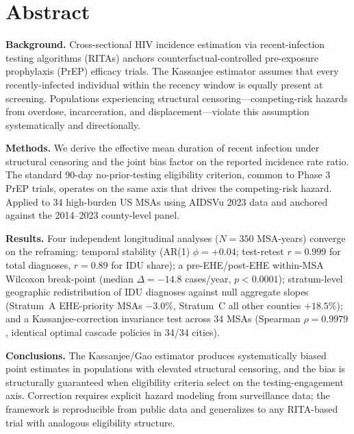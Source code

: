 \documentclass[12pt]{article}
\begin{document}
\newpage

\section*{Abstract}

\noindent\textbf{Background.} Cross-sectional HIV incidence estimation via recent-infection testing algorithms (RITAs) anchors counterfactual-controlled pre-exposure prophylaxis (PrEP) efficacy trials. The Kassanjee estimator assumes that every recently-infected individual within the recency window is equally present at screening. Populations experiencing structural censoring---competing-risk hazards from overdose, incarceration, and displacement---violate this assumption systematically and directionally.
\medskip

\noindent\textbf{Methods.} We derive the effective mean duration of recent infection under structural censoring and the joint bias factor on the reported incidence rate ratio. The standard 90-day no-prior-testing eligibility criterion, common to Phase 3 PrEP trials, operates on the same axis that drives the competing-risk hazard. Applied to 34 high-burden US MSAs using AIDSVu 2023 data and anchored against the 2014--2023 county-level panel.
\medskip

\noindent\textbf{Results.} Four independent longitudinal analyses ($N = 350$ MSA-years) converge on the reframing: temporal stability (AR(1) $\phi = +0.04$; test-retest $r = 0.999$ for total diagnoses, $r = 0.89$ for IDU share); a pre-EHE/post-EHE within-MSA Wilcoxon break-point (median $\Delta = -14.8$ cases/year, $p < 0.0001$); stratum-level geographic redistribution of IDU diagnoses against null aggregate slopes (Stratum~A EHE-priority MSAs $-3.0\%$, Stratum~C all other counties $+18.5\%$); and a Kassanjee-correction invariance test across 34 MSAs (Spearman $\rho = 0.9979$, identical optimal cascade policies in 34/34 cities).
\medskip

\noindent\textbf{Conclusions.} The Kassanjee/Gao estimator produces systematically biased point estimates in populations with elevated structural censoring, and the bias is structurally guaranteed when eligibility criteria select on the testing-engagement axis. Correction requires explicit hazard modeling from surveillance data; the framework is reproducible from public data and generalizes to any RITA-based trial with analogous eligibility structure.
\medskip
\end{document}
